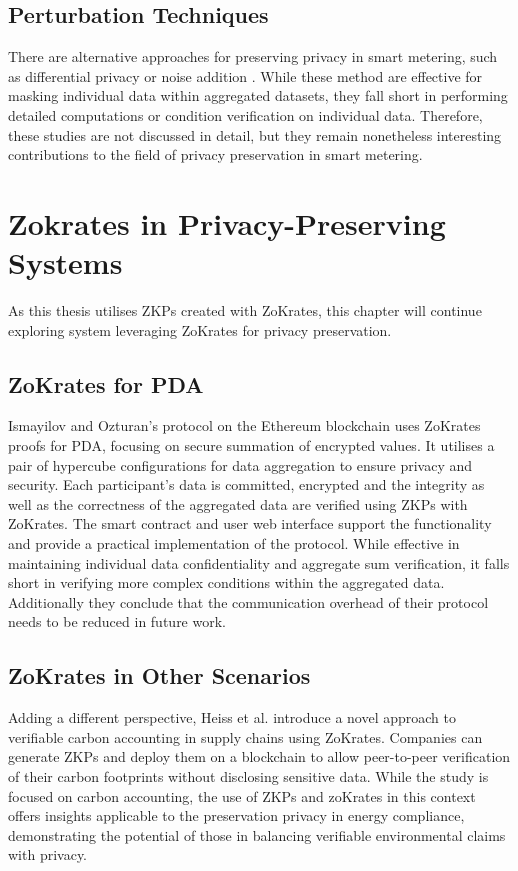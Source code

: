\subsection{Perturbation Techniques}

There are alternative approaches for preserving privacy in smart metering, such as differential privacy \cite{eibl2017differential} or noise addition \cite{noise}. While these method are effective for masking individual data within aggregated datasets, they fall short in performing detailed computations or condition verification on individual data. Therefore, these studies are not discussed in detail, but they remain nonetheless interesting contributions to the field of privacy preservation in smart metering.

\section{Zokrates in Privacy-Preserving Systems}

As this thesis utilises ZKPs created with ZoKrates, this chapter will continue exploring system leveraging ZoKrates for privacy preservation.

\subsection{ZoKrates for PDA}

Ismayilov and Ozturan’s protocol \cite{ismayilov2023trustless} on the Ethereum blockchain uses ZoKrates proofs for PDA, focusing on secure summation of encrypted values. It utilises a pair of hypercube configurations for data aggregation to ensure privacy and security. Each participant's data is committed, encrypted and the integrity as well as the correctness of the aggregated data are verified using ZKPs with ZoKrates. The smart contract and user web interface support the functionality and provide a practical implementation of the protocol. While effective in maintaining individual data confidentiality and aggregate sum verification, it falls short in verifying more complex conditions within the aggregated data. Additionally they conclude that the communication overhead of their protocol needs to be reduced in future work.

\subsection{ZoKrates in Other Scenarios}

Adding a different perspective, Heiss et al. \cite{heiss2023verifiable} introduce a novel approach to verifiable carbon accounting in supply chains using ZoKrates. Companies can generate ZKPs and deploy them on a blockchain to allow peer-to-peer verification of their carbon footprints without disclosing sensitive data.  
While the study is focused on carbon accounting, the use of ZKPs and zoKrates in this context offers insights applicable to the preservation privacy in energy compliance, demonstrating the potential of those in balancing verifiable environmental claims with privacy.

